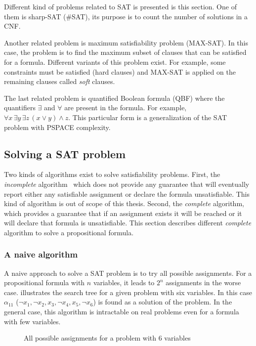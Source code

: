 Different kind of problems related to SAT is presented is this section.
One of them is sharp-SAT (\#SAT), its purpose is to count the number of solutions in a CNF.


Another related problem is maximum satisfiability problem (MAX-SAT). In this case, the problem
is to find the maximum subset of clauses that can be satisfied for a formula. Different variants
of this problem exist. For example, some constraints must be satisfied (hard clauses) and MAX-SAT
is applied on the remaining clauses called \emph{soft} clauses.

The last related problem is quantified Boolean formula (QBF) where the quantifiers $\exists$ and
$\forall$ are present in the formula. For example, $\forall x\, \exists y\, \exists z \, (x \lor y) \land z$.
This particular form is a generalization of the SAT problem with PSPACE complexity.

\subsection{Solving a SAT problem}
Two kinds of algorithms exist to solve satisfiability problems.
First, the \emph{incomplete} algorithm~\cite{biere2009handbook} which does not provide any guarantee that will eventually report either any satisfiable assignment or declare the formula unsatisfiable. This kind of algorithm is out of scope of this thesis. 
Second, the \emph{complete} algorithm, which provides a guarantee that if an assignment exists
it will be reached or it will declare that formula is unsatisfiable.
This section describes different \emph{complete }algorithm to solve a propositional formula.

\subsubsection{A naive algorithm}
A naive approach to solve a SAT problem is to try all possible assignments.
For a propositional formula with $n$ variables, it leads to $2^n$ assignments in the worse case.  
 illustrates the search tree for a given problem with six variables.
In this case $\alpha_{11}$ ($\neg x_1, \neg x_2, x_3, \neg x_4, x_5, \neg x_6 $) is found as a solution of the problem. In the general case,
this algorithm is  intractable on real problems even for a formula with few variables.

\begin{figure}[!htbp]
 \centering
 
 \caption{All possible assignments for a problem with 6 variables}
 \label{fig:naive_algo}
\end{figure}

